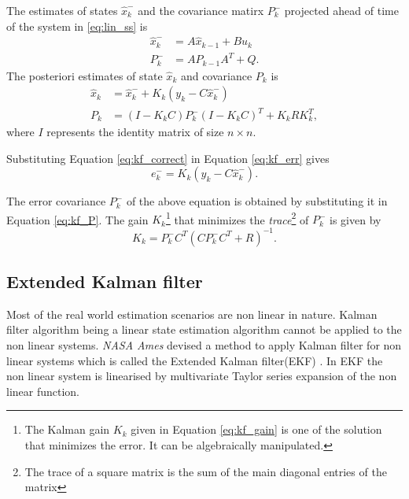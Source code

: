The estimates of states $\hat x_k^-$ and the covariance matirx $P_k^{-}$ projected ahead of time of the system in \ref{eq:lin_ss} is
\begin{equation}
	\begin{split}
	\hat{x}_k^{-} &= A \hat x_{k-1} + B u_k \\
	P_k^- &= A P_{k-1} A^{T} + Q .
	\end{split}
\end{equation}
The posteriori estimates of state $\hat x_k$ and covariance $P_k$ is
\begin{equation} 
	\label{eq:kf_correct}
	\begin{split}
	\hat{x}_k &= \hat{x}_k^{-} + K_k(y_k - C\hat x_k^{-})\\
    {P}_{k} &= (I - {K}_k {C}) {P}_{k}^{-} (I - {K}_k {C})^{T} + {K}_k {R} {K}_k^{T},
	\end{split}
\end{equation}
where $I$ represents the identity matrix of size $n \times n$.

Substituting Equation \ref{eq:kf_correct} in Equation \ref{eq:kf_err} gives
\begin{equation}
	e_k^- =  K_k(y_k - C\hat x_k^-).
\end{equation}

The error covariance $P_k^-$ of the above equation is obtained by substituting it in Equation \ref{eq:kf_P}. The gain $K_k$\footnote{The Kalman gain $K_k$ given in Equation \ref{eq:kf_gain} is one of the solution that minimizes the error. It can be algebraically manipulated.} that minimizes the \emph{trace}\footnote{The trace of a square matrix is the sum of the main diagonal entries of the matrix} of $P_k^-$ is given by
\begin{equation} \label{eq:kf_gain}
 K_k = P_k^- C^T(C P_k^- C^T + R)^{-1}.
    \end{equation}


\subsection{Extended Kalman filter}
Most of the real world estimation scenarios are non linear in nature. Kalman filter algorithm  being a linear state estimation algorithm cannot be applied to the non linear systems. \emph{NASA Ames} devised a method to apply Kalman filter for non linear systems which is called the Extended Kalman filter(EKF) \citep{ekf85}. In EKF the non linear system is linearised by multivariate Taylor series expansion of the non linear function. 

